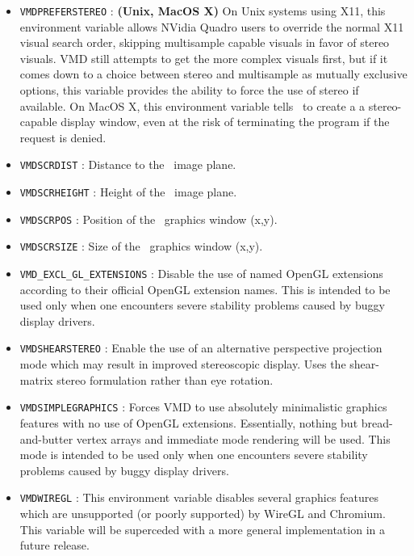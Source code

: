 \begin{itemize}
  \item {\tt VMDPREFERSTEREO} :
   {\bf (Unix, MacOS X)}
   On Unix systems using X11, this environment variable allows NVidia Quadro
   users to override the normal X11 visual search order, skipping multisample
   capable visuals in favor of stereo visuals.  VMD still attempts to get the  
   more complex visuals first, but if it comes down to a choice between stereo
   and multisample as mutually exclusive options, this variable provides 
   the ability to force the use of stereo if available.
   On MacOS X, this environment variable tells \VMD\ to create a
   a stereo-capable display window, even at the risk of terminating the 
   program if the request is denied.

  \item {\tt VMDSCRDIST} :
   Distance to the \VMD\ image plane.

  \item {\tt VMDSCRHEIGHT} :
   Height of the \VMD\ image plane.

  \item {\tt VMDSCRPOS} :
   Position of the \VMD\ graphics window (x,y).

  \item {\tt VMDSCRSIZE} :
   Size of the \VMD\ graphics window (x,y).

  \item {\tt VMD\_EXCL\_GL\_EXTENSIONS} :
  Disable the use of named OpenGL extensions according to their
  official OpenGL extension names.  This is intended to be used 
  only when one encounters severe stability problems caused by 
  buggy display drivers.


  \item {\tt VMDSHEARSTEREO} :
   Enable the use of an alternative perspective projection mode 
   which may result in improved stereoscopic display.  Uses the
   shear-matrix stereo formulation rather than eye rotation.


  \item {\tt VMDSIMPLEGRAPHICS} :
   Forces VMD to use absolutely minimalistic graphics features with no 
   use of OpenGL extensions.  Essentially, nothing but bread-and-butter 
   vertex arrays and immediate mode rendering will be used.  This mode
   is intended to be used only when one encounters severe stability 
   problems caused by buggy display drivers.

\item {\tt VMDWIREGL} :
   This environment variable disables several graphics features which
   are unsupported (or poorly supported) by WireGL and Chromium.
   This variable will be superceded with a more general
   implementation in a future release.

\end{itemize}

